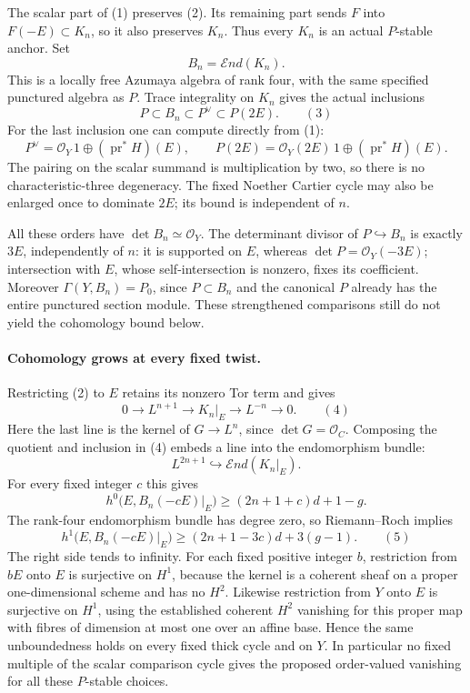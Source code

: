 The scalar part of (1) preserves (2). Its remaining part
sends $F$ into $F(-E)\subset K_n$, so it also preserves
$K_n$. Thus every $K_n$ is an actual $P$-stable anchor.
Set
\[
                         B_n=\mathcal End(K_n).

\]
This is a locally free Azumaya algebra of rank four, with
the same specified punctured algebra as $P$. Trace integrality
on $K_n$ gives the actual inclusions
\[
          P\subset B_n\subset P^\vee\subset P(2E).
                                                        \qquad(3)
\]
For the last inclusion one can compute directly from (1):
\[
 P^\vee=\mathcal O_Y\,1\oplus(\operatorname{pr}^*H)(E),
 \qquad
 P(2E)=\mathcal O_Y(2E)\,1\oplus(\operatorname{pr}^*H)(E).

\]
The pairing on the scalar summand is multiplication by two,
so there is no characteristic-three degeneracy. The fixed
Noether Cartier cycle may also be enlarged once to dominate
$2E$; its bound is independent of $n$.

All these orders have $\det B_n\simeq\mathcal O_Y$.
The determinant divisor of $P\hookrightarrow B_n$ is exactly
$3E$, independently of $n$: it is supported on $E$, whereas
$\det P=\mathcal O_Y(-3E)$; intersection with $E$, whose
self-intersection is nonzero, fixes its coefficient.
Moreover $\Gamma(Y,B_n)=P_0$, since $P\subset B_n$ and
the canonical $P$ already has the entire punctured section
module. These strengthened comparisons still do not yield
the cohomology bound below.

\paragraph{Cohomology grows at every fixed twist.}
Restricting (2) to $E$ retains its nonzero Tor term and gives
\[
       0\longrightarrow L^{n+1}\longrightarrow K_n|_E
              \longrightarrow L^{-n}\longrightarrow0.
                                                        \qquad(4)
\]
Here the last line is the kernel of $G\to L^n$, since
$\det G=\mathcal O_C$. Composing the quotient and inclusion
in (4) embeds a line into the endomorphism bundle:
\[
             L^{2n+1}\hookrightarrow\mathcal End(K_n|_E).

\]
For every fixed integer $c$ this gives
\[
 h^0\bigl(E,B_n(-cE)|_E\bigr)
     \ge (2n+1+c)d+1-g.

\]
The rank-four endomorphism bundle has degree zero, so
Riemann--Roch implies
\[
 h^1\bigl(E,B_n(-cE)|_E\bigr)
      \ge (2n+1-3c)d+3(g-1).
                                                        \qquad(5)
\]
The right side tends to infinity. For each fixed positive
integer $b$, restriction from $bE$ onto $E$ is surjective
on $H^1$, because the kernel is a coherent sheaf on a proper
one-dimensional scheme and has no $H^2$. Likewise restriction
from $Y$ onto $E$ is surjective on $H^1$, using the established
coherent $H^2$ vanishing for this proper map with fibres of
dimension at most one over an affine base. Hence the same
unboundedness holds on every fixed thick cycle and on $Y$.
In particular no fixed multiple of the scalar comparison
cycle gives the proposed order-valued vanishing for all
these $P$-stable choices.

